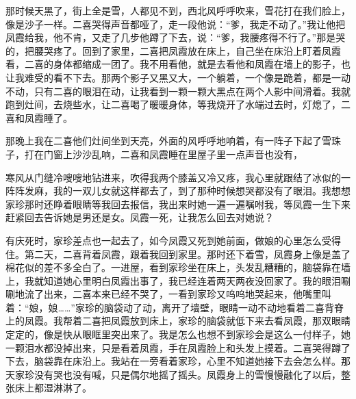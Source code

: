 \documentclass[12pt,UTF8]{ctexbook}
\begin{document}
那时候天黑了，街上全是雪，人都见不到，西北风呼呼吹来，雪花打在我们脸上，像是沙子一样。二喜哭得声音都哑了，走一段他说：“爹，我走不动了。”我让他把凤霞给我，他不肯，又走了几步他蹲了下去，说：“爹，我腰疼得不行了。”那是哭的，把腰哭疼了。回到了家里，二喜把凤霞放在床上，自己坐在床沿上盯着凤霞看，二喜的身体都缩成一团了。我不用看他，就是去看他和凤霞在墙上的影子，也让我难受的看不下去。那两个影子又黑又大，一个躺着，一个像是跪着，都是一动不动，只有二喜的眼泪在动，让我看到一颗一颗大黑点在两个人影中间滑着。我就跑到灶间，去烧些水，让二喜喝了暖暖身体，等我烧开了水端过去时，灯熄了，二喜和凤霞睡了。

那晚上我在二喜他们灶间坐到天亮，外面的风呼呼地响着，有一阵子下起了雪珠子，打在门窗上沙沙乱响，二喜和凤霞睡在里屋子里一点声音也没有，

寒风从门缝冷嗖嗖地钻进来，吹得我两个膝盖又冷又疼，我心里就跟结了冰似的一阵阵发麻，我的一双儿女就这样都去了，到了那种时候想哭都没有了眼泪。我想想家珍那时还睁着眼睛等我回去报信，我出来时她一遍一遍嘱咐我，等凤霞一生下来赶紧回去告诉她是男还是女。凤霞一死，让我怎么回去对她说？

有庆死时，家珍差点也一起去了，如今凤霞又死到她前面，做娘的心里怎么受得住。第二天，二喜背着凤霞，跟着我回到家里。那时还下着雪，凤霞身上像是盖了棉花似的差不多全白了。一进屋，看到家珍坐在床上，头发乱糟糟的，脑袋靠在墙上，我就知道她心里明白凤霞出事了，我已经连着两天两夜没回家了。我的眼泪唰唰地流了出来，二喜本来已经不哭了，一看到家珍又呜呜地哭起来，他嘴里叫着：“娘，娘……”家珍的脑袋动了动，离开了墙壁，眼睛一动不动地看着二喜背脊上的凤霞。我帮着二喜把凤霞放到床上，家珍的脑袋就低下来去看凤霞，那双眼睛定定的，像是快从眼眶里突出来了。我是怎么也想不到家珍会是这么一付样子，她一颗泪水都没掉出来，只是看着凤霞，手在凤霞脸上和头发上摸着。二喜哭得蹲了下去，脑袋靠在床沿上。我站在一旁看着家珍，心里不知道她接下去会怎么样。那天家珍没有哭也没有喊，只是偶尔地摇了摇头。凤霞身上的雪慢慢融化了以后，整张床上都湿淋淋了。
\end{document}
